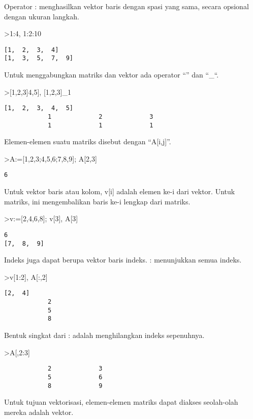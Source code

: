 \documentclass[
]{book}
\begin{document}
Operator : menghasilkan vektor baris dengan spasi yang sama, secara opsional dengan ukuran langkah.

\textgreater1:4, 1:2:10

\begin{verbatim}
[1,  2,  3,  4]
[1,  3,  5,  7,  9]
\end{verbatim}

Untuk menggabungkan matriks dan vektor ada operator ``\textbar{}'' dan ``\_``.

\textgreater{[}1,2,3{]}\textbar{[}4,5{]}, {[}1,2,3{]}\_1

\begin{verbatim}
[1,  2,  3,  4,  5]
            1             2             3 
            1             1             1 
\end{verbatim}

Elemen-elemen suatu matriks disebut dengan ``A{[}i,j{]}''.

\textgreater A:={[}1,2,3;4,5,6;7,8,9{]}; A{[}2,3{]}

\begin{verbatim}
6
\end{verbatim}

Untuk vektor baris atau kolom, v{[}i{]} adalah elemen ke-i dari vektor. Untuk matriks, ini mengembalikan baris ke-i lengkap dari matriks.

\textgreater v:={[}2,4,6,8{]}; v{[}3{]}, A{[}3{]}

\begin{verbatim}
6
[7,  8,  9]
\end{verbatim}

Indeks juga dapat berupa vektor baris indeks. : menunjukkan semua indeks.

\textgreater v{[}1:2{]}, A{[}:,2{]}

\begin{verbatim}
[2,  4]
            2 
            5 
            8 
\end{verbatim}

Bentuk singkat dari : adalah menghilangkan indeks sepenuhnya.

\textgreater A{[},2:3{]}

\begin{verbatim}
            2             3 
            5             6 
            8             9 
\end{verbatim}

Untuk tujuan vektorisasi, elemen-elemen matriks dapat diakses seolah-olah mereka adalah vektor.
\end{document}
